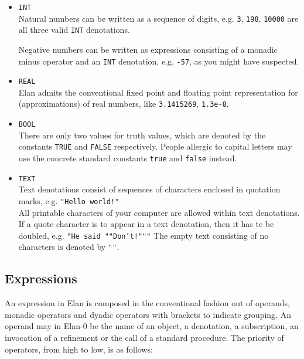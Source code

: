 \begin{itemize}
\item {\tt INT}\\
                Natural numbers can be written as a sequence of digits, e.g.
                {\tt 3}, {\tt 198}, {\tt 10000}
                are all three valid {\tt INT} denotations.

                Negative numbers can be written as expressions consisting of a
                monadic minus operator and an {\tt INT} denotation, e.g.
                {\tt -57}, as you might have suspected.
\item {\tt REAL}\\
                Elan admits the conventional fixed point and floating point
                representation for (approximations) of real numbers,
                like {\tt 3.1415269}, {\tt 1.3e-8}.
\item {\tt BOOL}\\
                There are only two values for truth values, which are denoted
                by the constants {\tt TRUE} and {\tt FALSE} respectively.
                People allergic to capital letters may use the concrete
                standard constants {\tt true} and {\tt false} instead.
\item {\tt TEXT}\\
                Text denotations consist of sequences of characters
                enclosed in quotation marks, e.g. {\tt "Hello world!"}\\
                All printable characters of your computer are allowed
                within text denotations. If a quote character is to appear
                in a text denotation, then it has te be doubled, e.g.
                {\tt "He said ""Don't!"""}
                The empty text consisting of no characters is denoted by
                {\tt ""}.
\end{itemize}

\subsection{Expressions}

An expression in Elan is composed in the conventional fashion
out of operands, monadic operators and dyadic operators with
brackets to indicate grouping.
An operand may in Elan-0 be the name of an object, a denotation,
a subscription, an invocation of a refinement or the call of
a standard procedure. The priority of operators, from high to
low, is as follows:

